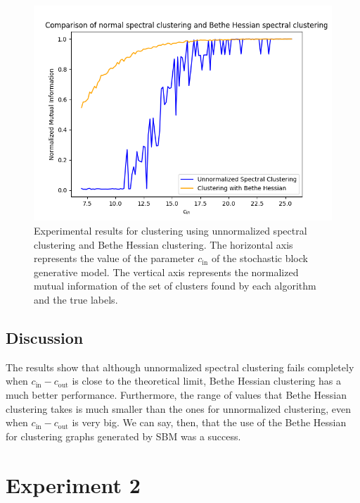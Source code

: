 \begin{figure}[h]
\begin{center}
\includegraphics[width=14cm]{figures/bethe_hessian_triumph.png}
\end{center}
   \caption[Experimental results for clustering using unnormalized spectral clustering and Bethe Hessian clustering]{Experimental results for clustering using unnormalized spectral clustering and Bethe Hessian clustering. The horizontal axis represents the value of the parameter $c_\text{in}$ of the stochastic block generative model. The vertical axis represents the normalized mutual information of the set of clusters found by each algorithm and the true labels.}
\label{bethe_hessian_triumph}
\end{figure}

\subsection*{Discussion}
The results show that although unnormalized spectral clustering fails completely when $c_\text{in} - c_\text{out}$ is close to the theoretical limit, Bethe Hessian clustering has a much better performance. 
Furthermore, the range of values that Bethe Hessian clustering takes is much smaller than the ones for unnormalized clustering, even when $c_\text{in} - c_\text{out}$ is very big.
We can say, then, that the use of the Bethe Hessian for clustering graphs generated by SBM was a success.

\section{Experiment 2}
